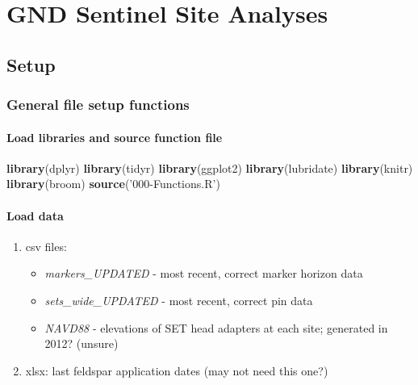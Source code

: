 \documentclass[]{article}
\title{}
\author{}
\date{August 29, 2018}
\newenvironment{Shaded}{\begin{snugshade}}{\end{snugshade}}
\newcommand{\KeywordTok}[1]{\textcolor[rgb]{0.13,0.29,0.53}{\textbf{#1}}}
\newcommand{\StringTok}[1]{\textcolor[rgb]{0.31,0.60,0.02}{#1}}
\newcommand{\NormalTok}[1]{#1}
\providecommand{\tightlist}{%
  \setlength{\itemsep}{0pt}\setlength{\parskip}{0pt}}
\let\oldparagraph\paragraph
\renewcommand{\paragraph}[1]{\oldparagraph{#1}\mbox{}}
\begin{document}
{
\setcounter{tocdepth}{4}
\tableofcontents
}
\section{GND Sentinel Site Analyses}\label{gnd-sentinel-site-analyses}

\subsection{Setup}\label{setup}

\subsubsection{General file setup
functions}\label{general-file-setup-functions}

\paragraph{Load libraries and source function
file}\label{load-libraries-and-source-function-file}

\begin{Shaded}
\begin{Highlighting}[]
\KeywordTok{library}\NormalTok{(dplyr)}
\KeywordTok{library}\NormalTok{(tidyr)}
\KeywordTok{library}\NormalTok{(ggplot2)}
\KeywordTok{library}\NormalTok{(lubridate)}
\KeywordTok{library}\NormalTok{(knitr)}
\KeywordTok{library}\NormalTok{(broom)}
\KeywordTok{source}\NormalTok{(}\StringTok{'000-Functions.R'}\NormalTok{)}
\end{Highlighting}
\end{Shaded}

\paragraph{Load data}\label{load-data}

\begin{enumerate}
\def\labelenumi{\alph{enumi}.}
\tightlist
\item
  csv files:

  \begin{itemize}
  \tightlist
  \item
    \emph{markers\_UPDATED} - most recent, correct marker horizon data\\
  \item
    \emph{sets\_wide\_UPDATED} - most recent, correct pin data\\
  \item
    \emph{NAVD88} - elevations of SET head adapters at each site;
    generated in 2012? (unsure)
  \end{itemize}
\item
  xlsx: last feldspar application dates (may not need this one?)
\end{enumerate}
\end{document}
